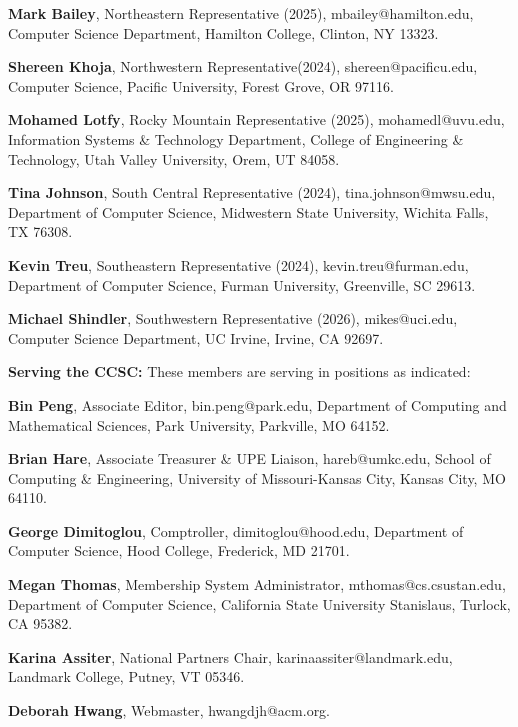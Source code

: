 \documentclass{article}
\begin{document}
\begin{multicols}{2}
\begin{raggedright}
{\noindent
\textbf{Mark Bailey}, Northeastern Representative (2025), mbailey@hamilton.edu, Computer Science Department, Hamilton College, Clinton, NY 13323.

\noindent
\textbf{Shereen Khoja},	Northwestern Representative(2024), shereen@pacificu.edu,
Computer Science, Pacific University, Forest Grove, OR 97116.

\noindent
\textbf{Mohamed Lotfy}, Rocky Mountain Representative (2025),
mohamedl@uvu.edu, Information Systems \& Technology Department,
College of Engineering \& Technology, Utah Valley University, Orem, UT 84058.

\noindent
\textbf{Tina Johnson}, South Central Representative (2024),
tina.johnson@mwsu.edu, Department of Computer Science, Midwestern State University, Wichita Falls, TX 76308.

\noindent
\textbf{Kevin Treu}, Southeastern Representative (2024),
kevin.treu@furman.edu, Department of Computer Science, Furman University, Greenville,
SC 29613.

\noindent
\textbf{Michael Shindler}, Southwestern Representative (2026),
mikes@uci.edu, Computer Science Department, UC Irvine, Irvine, CA 92697.

\clearpage
\vspace{0.2in}
\noindent
\textbf{Serving the CCSC:} These members are serving in positions as indicated:

\noindent
\textbf{Bin Peng}, Associate Editor,
bin.peng@park.edu, Department of Computing and Mathematical Sciences, Park University, Parkville, MO 64152.

\noindent
\textbf{Brian Hare}, Associate Treasurer \& UPE Liaison, hareb@umkc.edu,
School of Computing \& Engineering, University of Missouri-Kansas City, Kansas City, MO 64110.

\noindent
\textbf{George Dimitoglou}, Comptroller,
dimitoglou@hood.edu,
Department of Computer Science, Hood College, Frederick, MD 21701.

\noindent
\textbf{Megan Thomas}, Membership System Administrator,
mthomas@cs.csustan.edu, Department of Computer Science, California State University Stanislaus, Turlock, CA 95382.

\noindent
\textbf{Karina Assiter}, National Partners Chair, karinaassiter@landmark.edu, Landmark College, Putney, VT 05346.

\noindent
\textbf{Deborah Hwang}, Webmaster, hwangdjh@acm.org.

} %

\end{raggedright}
\end{multicols}
\end{document}

